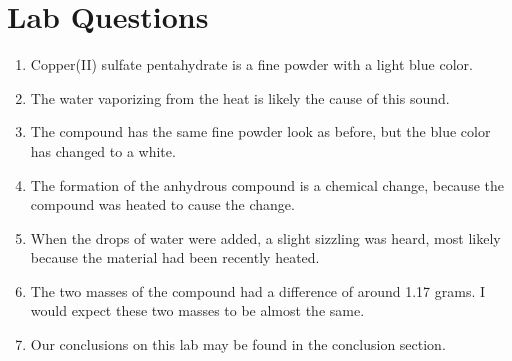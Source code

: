 \documentclass{article}
\begin{document}
\section{Lab Questions}
\begin{enumerate}
\item Copper(II) sulfate pentahydrate is a fine powder with a light blue color.
\item The water vaporizing from the heat is likely the cause of this sound.
\item The compound has the same fine powder look as before, but the blue color has changed to a white.
\item The formation of the anhydrous compound is a chemical change, because the compound was heated to cause the change.
\item When the drops of water were added, a slight sizzling was heard, most likely because the material had been recently heated.
\item The two masses of the compound had a difference of around 1.17 grams. I would expect these two masses to be almost the same.
\item Our conclusions on this lab may be found in the conclusion section. 
\end{enumerate}
\end{document}
